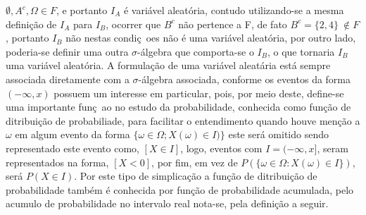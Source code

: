   $\emptyset, A^{c}, \Omega \in F$, e portanto $I_A$ \'{e} vari\'{a}vel aleat\'{o}ria, contudo utilizando-se a mesma defini\c{c}\~{a}o de
  $I_A$ para $I_B$, ocorrer que $B^{c}$ n\~{a}o pertence a F, de fato $B^{c} = \{2,4 \}\ \not \in F$, portanto $I_B$ n\~{a}o nestas
  condi\c{c}~{o}es n\~{a}o \'{e} uma  vari\'{a}vel aleat\'{o}ria, por outro lado, poderia-se definir uma outra $\sigma$-\'{a}lgebra 
  que comporta-se o $I_B$, o que tornaria $I_B$ uma vari\'{a}vel aleat\'{o}ria. A formula\c{c}\~{a}o de uma vari\'{a}vel aleat\'{a}ria
  est\'{a} sempre associada diretamente  com a $\sigma$-\'{a}lgebra associada, conforme \cite{magalhaes} os eventos da forma 
  $( - \infty, x)$ possuem um interesse em particular, pois, por meio deste, define-se uma importante fun\c{c}~{a}o no estudo da 
  probabilidade, conhecida como fun\c{c}\~{a}o de ditribui\c{c}\~{a}o de probabiliade, para facilitar o entendimento
  quando houve men\c{c}\~{a}o a $\omega$ em algum evento da forma $ \{ \omega \in \Omega; X(\omega) \in I)\} $ este ser\'{a} omitido
  sendo representado este evento como, $ [ X \in I ]$, logo, eventos com $I = (-\infty, x]$, seram representados  na forma,
  $[X < 0]$, por fim, em vez de $P(\{\omega \in \Omega: X(\omega) \in I \})$, ser\'{a} $P(X \in I)$. Por este tipo de simplica\c{c}\~{a}o
  a fun\c{c}\~{a}o de ditribui\c{c}\~{a}o de probabilidade tamb\'{e}m \'{e} conhecida por fun\c{c}\~{a}o de probabilidade acumulada,
  pelo acumulo de probabilidade no intervalo real nota-se, pela defini\c{c}\~{a}o a seguir.

